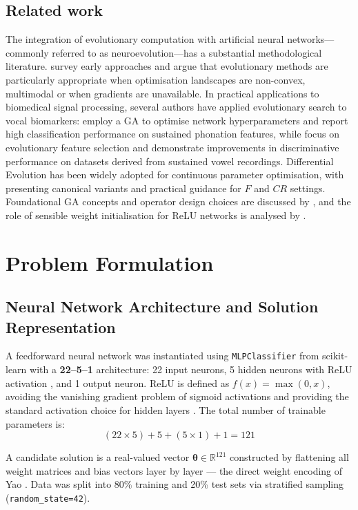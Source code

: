 \documentclass[12pt, a4paper]{article}
\begin{document}
\subsection*{Related work}
The integration of evolutionary computation with artificial neural networks—commonly referred to as neuroevolution—has a substantial methodological literature. \citet{yao1999} survey early approaches and argue that evolutionary methods are particularly appropriate when optimisation landscapes are non-convex, multimodal or when gradients are unavailable. In practical applications to biomedical signal processing, several authors have applied evolutionary search to vocal biomarkers: \citet{ali2019} employ a GA to optimise network hyperparameters and report high classification performance on sustained phonation features, while \citet{dao2022} focus on evolutionary feature selection and demonstrate improvements in discriminative performance on datasets derived from sustained vowel recordings. Differential Evolution has been widely adopted for continuous parameter optimisation, with \citet{storn1997} presenting canonical variants and practical guidance for $F$ and $CR$ settings. Foundational GA concepts and operator design choices are discussed by \citet{goldberg1989}, and the role of sensible weight initialisation for ReLU networks is analysed by \citet{he2015}.

\section{Problem Formulation}

\subsection{Neural Network Architecture and Solution Representation}

A feedforward neural network was instantiated using \texttt{MLPClassifier} from scikit-learn with a \textbf{22--5--1} architecture: 22 input neurons, 5 hidden neurons with ReLU activation \cite{nair2010}, and 1 output neuron. ReLU is defined as $f(x) = \max(0,x)$, avoiding the vanishing gradient problem of sigmoid activations and providing the standard activation choice for hidden layers \cite{he2015}. The total number of trainable parameters is:
\[
(22 \times 5) + 5 + (5 \times 1) + 1 = 121
\]

A candidate solution is a real-valued vector $\boldsymbol{\theta} \in \mathbb{R}^{121}$ constructed by flattening all weight matrices and bias vectors layer by layer --- the direct weight encoding of Yao \cite{yao1999}. Data was split into 80\% training and 20\% test sets via stratified sampling (\texttt{random\_state=42}).
\end{document}
